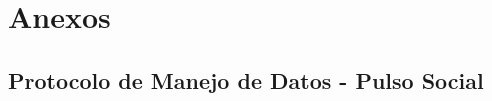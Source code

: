 \documentclass[11pt,oneside,a4paper,english,french,spanish,brazil]{abntex2}
\begin{document}
          
          \clearpage
          \newpage
        
          
          \pagestyle{modal}
 
           
           \clearpage
           
          
          \clearpage
          \newpage


           
           \clearpage
           
           
          
          \clearpage
          
          \pagestyle{modal}
           
           \clearpage

          \pagestyle{modalpre}

            \clearpage
            

            
            
             \part*{Anexos}
             \begin{anexosenv}
             
             \chapter{Protocolo de Manejo de Datos - Pulso Social}\label{anex:anexo1}
                
             \end{anexosenv}

            \printindex



\end{document}
